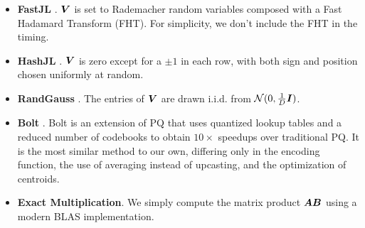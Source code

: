 \begin{itemize}
    \item \textbf{FastJL} \cite{fastjl}. $\bm{V}$ is set to Rademacher random variables composed with a Fast Hadamard Transform (FHT). For simplicity, we don't include the FHT in the timing.
    \item \textbf{HashJL} \cite{hashjl}. $\bm{V}$ is zero except for a $\pm 1$ in each row, with both sign and position chosen uniformly at random.
    \item \textbf{RandGauss} \cite{lshOrig,E2LSH}. The entries of $\bm{V}$ are drawn i.i.d. from $\mathcal{N}(0, \frac{1}{D}\bm{I})$.
    \item \textbf{Bolt} \cite{bolt}. Bolt is an extension of PQ that uses quantized lookup tables and a reduced number of codebooks to obtain $10\times$ speedups over traditional PQ. It is the most similar method to our own, differing only in the encoding function, the use of averaging instead of upcasting, and the optimization of centroids. %
    \item \textbf{Exact Multiplication}. We simply compute the matrix product $\bm{A}\bm{B}$ using a modern BLAS implementation.
\end{itemize}
\vspace{-2mm}
